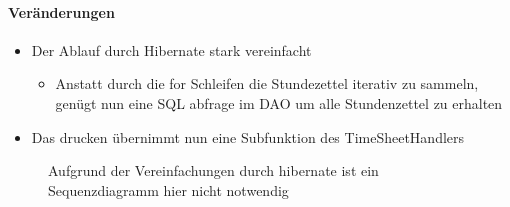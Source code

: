 \paragraph{Veränderungen}
\begin{itemize}
    \item Der Ablauf durch Hibernate stark vereinfacht
    \begin{itemize}
        \item Anstatt durch die for Schleifen die Stundezettel iterativ zu sammeln, genügt nun eine SQL abfrage im DAO um alle Stundenzettel zu erhalten
    \end{itemize}
    \item Das drucken übernimmt nun eine Subfunktion des TimeSheetHandlers
\end{itemize}

\begin{figure}
  \centering
   \caption{Aufgrund der Vereinfachungen durch hibernate ist ein Sequenzdiagramm hier nicht notwendig}
\end{figure}
